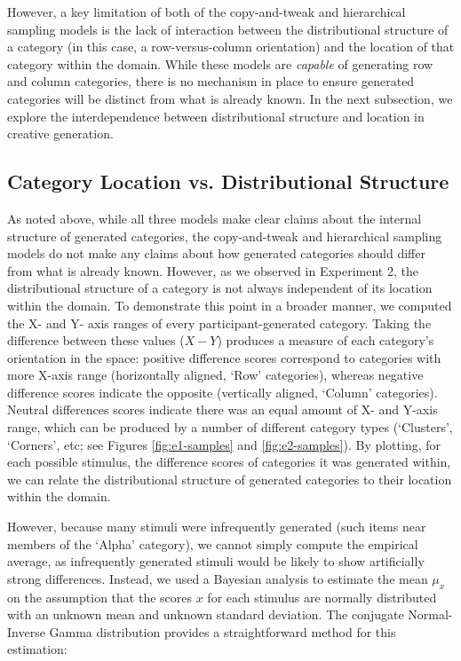 \documentclass[12pt]{article}
\begin{document}
\begin{flushleft}
However, a key limitation of both of the copy-and-tweak and hierarchical sampling models is the lack of interaction between the distributional structure of a category (in this case, a row-versus-column orientation) and the location of that category within the domain. While these models are {\em capable} of generating row and column categories, there is no mechanism in place to ensure generated categories will be distinct from what is already known. In the next subsection, we explore the interdependence between distributional structure and location in creative generation.

\subsection{Category Location vs. Distributional Structure}

As noted above, while all three models make clear claims about the internal structure of generated categories, the copy-and-tweak and hierarchical sampling models do not make any claims about how generated categories should differ from what is already known. However, as we observed in Experiment 2, the distributional structure of a category is not always independent of its location within the domain. To demonstrate this point in a broader manner, we computed the X- and Y- axis ranges of every participant-generated category. Taking the difference between these values ($X-Y$) produces a measure of each category's orientation in the space: positive difference scores correspond to categories with more X-axis range (horizontally aligned, `Row' categories), whereas negative difference scores indicate the opposite (vertically aligned, `Column' categories). Neutral differences scores indicate there was an equal amount of X- and Y-axis range, which can be produced by a number of different category types (`Clusters', `Corners', etc; see Figures \ref{fig:e1-samples} and \ref{fig:e2-samples}). By plotting, for each possible stimulus, the difference scores of categories it was generated within, we can relate the distributional structure of generated categories to their location within the domain.

However, because many stimuli were infrequently generated (such items near members of the `Alpha' category), we cannot simply compute the empirical average, as infrequently generated stimuli would be likely to show artificially strong differences. Instead, we used a Bayesian analysis to estimate the mean $\mu_x$ on the assumption that the scores $x$ for each stimulus are normally distributed with an unknown mean and unknown standard deviation. The conjugate Normal-Inverse Gamma distribution provides a straightforward method for this estimation:



\end{flushleft}
\end{document}

